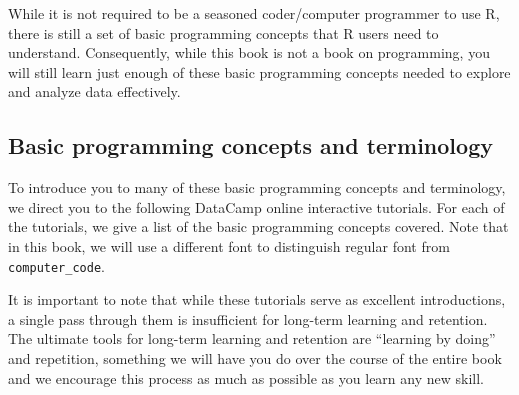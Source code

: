 \documentclass[12pt, krantz2,]{krantz}
\begin{document}
While it is not required to be a seasoned coder/computer programmer to use R, there is still a set of basic programming concepts that R users need to understand. Consequently, while this book is not a book on programming, you will still learn just enough of these basic programming concepts needed to explore and analyze data effectively.

\hypertarget{programming-concepts}{%
\subsection{Basic programming concepts and terminology}\label{programming-concepts}}

To introduce you to many of these basic programming concepts and terminology, we direct you to the following DataCamp online interactive tutorials. For each of the tutorials, we give a list of the basic programming concepts covered. Note that in this book, we will use a different font to distinguish regular font from \texttt{computer\_code}.

It is important to note that while these tutorials serve as excellent introductions, a single pass through them is insufficient for long-term learning and retention. The ultimate tools for long-term learning and retention are ``learning by doing'' and repetition, something we will have you do over the course of the entire book and we encourage this process as much as possible as you learn any new skill.
\end{document}
